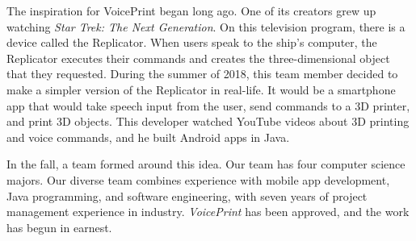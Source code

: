 The inspiration for VoicePrint began long ago. One of its creators grew up watching \textit{Star Trek: The Next Generation}. On this television program, there is a device called the Replicator. When users speak to the ship's computer, the Replicator executes their commands and creates the three-dimensional object that they requested. During the summer of 2018, this team member decided to make a simpler version of the Replicator in real-life. It would be a smartphone app that would take speech input from the user, send commands to a 3D printer, and print 3D objects. This developer watched YouTube videos about 3D printing and voice commands, and he built Android apps in Java.

In the fall, a team formed around this idea. Our team has four computer science majors. Our diverse team combines experience with mobile app development, Java programming, and software engineering, with seven years of project management experience in industry. \textit{VoicePrint} has been approved, and the work has begun in earnest.